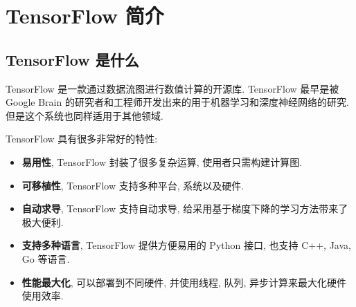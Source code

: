 

\section{TensorFlow 简介}

\begin{frame}{\secname}
\begin{center}
  \vfill
   \vspace{10pt}

  \begin{varwidth}{\textwidth}
  \large
  \tableofcontents[sectionstyle = hide/hide, subsectionstyle = show/show/hide]
  \end{varwidth}
  \vfill
\end{center}
\end{frame}

\subsection{TensorFlow 是什么}
\begin{frame}{\insertsection}{\insertsubsection}
    TensorFlow 是一款通过数据流图进行数值计算的开源库. TensorFlow 最早是被 Google Brain 的研究者和工程师开发出来的用于机器学习和深度神经网络的研究. 但是这个系统也同样适用于其他领域.

    TensorFlow 具有很多非常好的特性:%
    \begin{itemize}
        \item \textbf{易用性}, TensorFlow 封装了很多复杂运算, 使用者只需构建计算图.
        \item \textbf{可移植性}, TensorFlow 支持多种平台, 系统以及硬件.
        \item \textbf{自动求导}, TensorFlow 支持自动求导, 给采用基于梯度下降的学习方法带来了极大便利.
        \item \textbf{支持多种语言}, TensorFlow 提供方便易用的 Python 接口, 也支持 C++, Java, Go 等语言.
        \item \textbf{性能最大化}, 可以部署到不同硬件, 并使用线程, 队列, 异步计算来最大化硬件使用效率.
    \end{itemize}
\end{frame}

